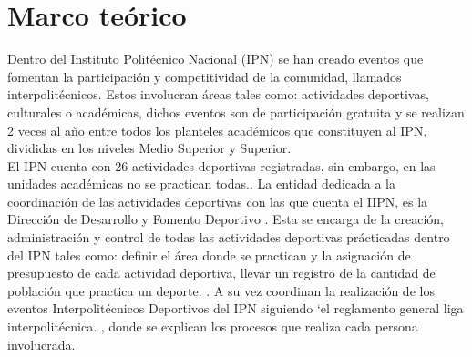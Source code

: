 \chapter{Marco te\'orico}
	
	\noindent Dentro del Instituto Politécnico Nacional (IPN) se han creado eventos que fomentan la participación y competitividad de la comunidad, llamados interpolitécnicos. Estos involucran áreas tales como: actividades deportivas, culturales o académicas, dichos eventos son de participación gratuita y se realizan 2 veces al año entre todos los planteles académicos que constituyen al IPN, divididas en los niveles Medio Superior y Superior.  \cite{Reglas}\\
	\noindent El IPN cuenta con 26 actividades deportivas registradas, sin embargo, en las unidades académicas no se practican todas.\cite{Reglas}.
	\noindent La entidad dedicada a la coordinación de las actividades deportivas con las que cuenta el IIPN, es la Dirección de Desarrollo y Fomento Deportivo \cite{DDYFD}. Esta se encarga de la creación, administración y control de todas las actividades deportivas prácticadas dentro del IPN tales como: definir el área donde se practican y la asignación de presupuesto de cada actividad deportiva, llevar un registro de la cantidad de población que practica un deporte. \cite{Reglamento}.	
	\noindent A su vez coordinan la realización de los eventos Interpolitécnicos Deportivos del IPN siguiendo ‘el reglamento general liga interpolitécnica. \cite{Reglamento}, donde se explican los  procesos que realiza cada persona involucrada.\\
	
